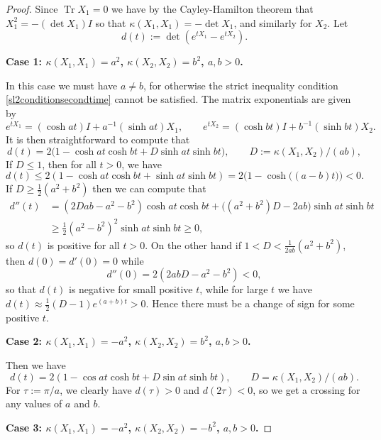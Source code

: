 \documentclass[10pt,a4paper]{amsart}
\DeclareMathOperator{\Tr}{Tr}
\newcommand{\mattyone}{X_1}
\newcommand{\mattytwo}{X_2}
\newcommand{\simpkill}{\kappa}
\begin{document}
\begin{proof}
    Since $\Tr{\mattyone}=0$ we have by the Cayley-Hamilton theorem that $\mattyone^2 = -(\det{\mattyone}) I$ so that $\simpkill(\mattyone,\mattyone) = -\det{\mattyone}$, and similarly for $\mattytwo$. Let 
    $$d(t) := \det{(e^{t\mattyone}-e^{t\mattytwo})}.$$
 

\textbf{Case 1: $\simpkill(\mattyone,\mattyone)=a^2$, $\simpkill(\mattytwo,\mattytwo)=b^2$, $a,b>0$.} 

    In this case we must have $a\ne b$, for otherwise the strict inequality condition \eqref{sl2conditionsecondtime} cannot be satisfied.
    The matrix exponentials are given by 
    $$ e^{t\mattyone} = (\cosh{at}) I + a^{-1}(\sinh{at}) \mattyone, \qquad e^{t\mattytwo} = (\cosh{bt}) I + b^{-1}(\sinh{bt}) \mattytwo. $$
    It is then straightforward to compute that 
\begin{equation*}%
    d(t) = 2\big( 1-\cosh{at}\cosh{bt} + D \sinh{at}\sinh{bt}\big), \qquad D:=\simpkill(\mattyone,\mattytwo)/(ab), 
    \end{equation*}  
If $D\le 1$, then for all $t>0$, we have 
    $$ d(t) \le 2(1-\cosh{at}\cosh{bt} + \sinh{at}\sinh{bt}) = 2\big(1 - 
    \cosh{\big((a-b)t\big)}\big) < 0. $$
    If $D\ge \tfrac{1}{2}(a^2+b^2)$ then we can compute that \begin{align*}
        d''(t) &= (2Dab-a^2-b^2) \cosh{at}\cosh{bt} + \big( (a^2+b^2)D - 2ab\big) \sinh{at}\sinh{bt} \\
        &\ge \tfrac{1}{2} (a^2-b^2)^2 \sinh{at}\sinh{bt}\ge 0,
        \end{align*}
    so $d(t)$ is positive for all $t>0$. 
    On the other hand if $1<D<\tfrac{1}{2ab}(a^2+b^2)$, then $d(0)=d'(0)=0$ while $$d''(0) = 2(2abD-a^2-b^2) < 0,$$
    so that $d(t)$ is negative for small positive $t$,
    while for large $t$ we have $d(t) \approx \tfrac{1}{2}(D-1)e^{(a+b)t}>0$. Hence there must be a change of sign for some positive $t$.

    \textbf{Case 2: $\simpkill(\mattyone,\mattyone)=-a^2$, $\simpkill(\mattytwo,\mattytwo)=b^2$, $a,b>0$.} 
    
    Then we have 
    $$d(t) = 2(1-\cos{at} \cosh{bt} + D\sin{at} \sinh{bt}), \qquad D = \simpkill(\mattyone,\mattytwo)/(ab). $$
    For $\tau:=\pi/a$, we clearly have $d(\tau)>0$ and $d(2\tau)<0$, so we get a crossing for any values of $a$ and $b$. 

    \textbf{Case 3: $\simpkill(\mattyone,\mattyone)=-a^2$, $\simpkill(\mattytwo,\mattytwo)=-b^2$, $a,b>0$.}  


\end{proof}
\end{document}
